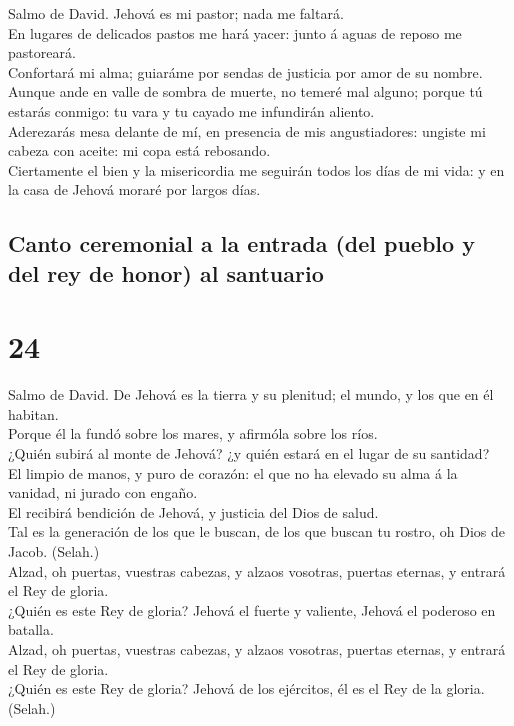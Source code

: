  Salmo de David. Jehová es mi pastor; nada me faltará.\\
 En lugares de delicados pastos me hará yacer: junto á
aguas de reposo me pastoreará.\\
 Confortará mi alma; guiaráme por sendas de justicia por
amor de su nombre.\\
 Aunque ande en valle de sombra de muerte, no temeré mal
alguno; porque tú estarás conmigo: tu vara y tu cayado me infundirán
aliento.\\
 Aderezarás mesa delante de mí, en presencia de mis
angustiadores: ungiste mi cabeza con aceite: mi copa está rebosando.\\
 Ciertamente el bien y la misericordia me seguirán todos
los días de mi vida: y en la casa de Jehová moraré por largos días.

\hypertarget{canto-ceremonial-a-la-entrada-del-pueblo-y-del-rey-de-honor-al-santuario}{%
\subsection{Canto ceremonial a la entrada (del pueblo y del rey de
honor) al
santuario}\label{canto-ceremonial-a-la-entrada-del-pueblo-y-del-rey-de-honor-al-santuario}}

\hypertarget{section-23}{%
\section{24}\label{section-23}}

 Salmo de David. De Jehová es la tierra y su plenitud; el
mundo, y los que en él habitan.\\
 Porque él la fundó sobre los mares, y afirmóla sobre los
ríos.\\
 ¿Quién subirá al monte de Jehová? ¿y quién estará en el
lugar de su santidad?\\
 El limpio de manos, y puro de corazón: el que no ha
elevado su alma á la vanidad, ni jurado con engaño.\\
 El recibirá bendición de Jehová, y justicia del Dios de
salud.\\
 Tal es la generación de los que le buscan, de los que
buscan tu rostro, oh Dios de Jacob. (Selah.)\\
 Alzad, oh puertas, vuestras cabezas, y alzaos vosotras,
puertas eternas, y entrará el Rey de gloria.\\
 ¿Quién es este Rey de gloria? Jehová el fuerte y
valiente, Jehová el poderoso en batalla.\\
 Alzad, oh puertas, vuestras cabezas, y alzaos vosotras,
puertas eternas, y entrará el Rey de gloria.\\
 ¿Quién es este Rey de gloria? Jehová de los ejércitos,
él es el Rey de la gloria. (Selah.)

